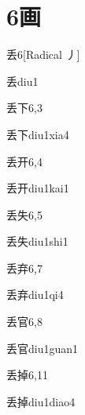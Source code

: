 
\section*{6画}

\begin{entry}{丢}{6}[Radical 丿]
  \begin{phonetics}{丢}{diu1}
  \end{phonetics}
\end{entry}

\begin{entry}{丢下}{6,3}
  \begin{phonetics}{丢下}{diu1xia4}
  \end{phonetics}
\end{entry}

\begin{entry}{丢开}{6,4}
  \begin{phonetics}{丢开}{diu1kai1}
  \end{phonetics}
\end{entry}

\begin{entry}{丢失}{6,5}
  \begin{phonetics}{丢失}{diu1shi1}
  \end{phonetics}
\end{entry}

\begin{entry}{丢弃}{6,7}
  \begin{phonetics}{丢弃}{diu1qi4}
  \end{phonetics}
\end{entry}

\begin{entry}{丢官}{6,8}
  \begin{phonetics}{丢官}{diu1guan1}
  \end{phonetics}
\end{entry}

\begin{entry}{丢掉}{6,11}
  \begin{phonetics}{丢掉}{diu1diao4}
  \end{phonetics}
\end{entry}


